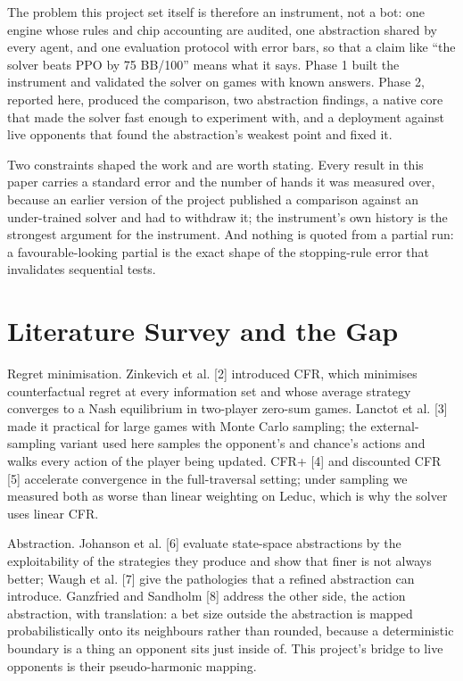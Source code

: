 \documentclass[runningheads]{llncs}
\begin{document}
The problem this project set itself is therefore an instrument, not a bot: one engine whose rules and chip accounting are audited, one abstraction shared by every agent, and one evaluation protocol with error bars, so that a claim like ``the solver beats PPO by 75 BB/100'' means what it says. Phase 1 built the instrument and validated the solver on games with known answers. Phase 2, reported here, produced the comparison, two abstraction findings, a native core that made the solver fast enough to experiment with, and a deployment against live opponents that found the abstraction's weakest point and fixed it.

Two constraints shaped the work and are worth stating. Every result in this paper carries a standard error and the number of hands it was measured over, because an earlier version of the project published a comparison against an under-trained solver and had to withdraw it; the instrument's own history is the strongest argument for the instrument. And nothing is quoted from a partial run: a favourable-looking partial is the exact shape of the stopping-rule error that invalidates sequential tests.

\section{Literature Survey and the Gap}
Regret minimisation. Zinkevich et al. [2] introduced CFR, which minimises counterfactual regret at every information set and whose average strategy converges to a Nash equilibrium in two-player zero-sum games. Lanctot et al. [3] made it practical for large games with Monte Carlo sampling; the external-sampling variant used here samples the opponent's and chance's actions and walks every action of the player being updated. CFR+ [4] and discounted CFR [5] accelerate convergence in the full-traversal setting; under sampling we measured both as worse than linear weighting on Leduc, which is why the solver uses linear CFR.

Abstraction. Johanson et al. [6] evaluate state-space abstractions by the exploitability of the strategies they produce and show that finer is not always better; Waugh et al. [7] give the pathologies that a refined abstraction can introduce. Ganzfried and Sandholm [8] address the other side, the action abstraction, with translation: a bet size outside the abstraction is mapped probabilistically onto its neighbours rather than rounded, because a deterministic boundary is a thing an opponent sits just inside of. This project's bridge to live opponents is their pseudo-harmonic mapping.
\end{document}
